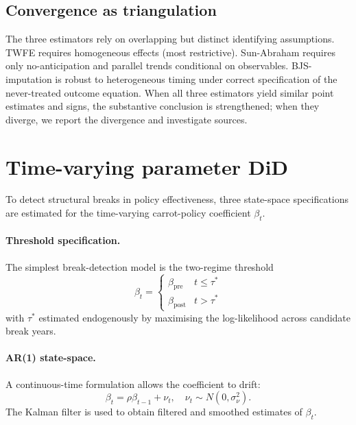 \subsection{Convergence as triangulation}

The three estimators rely on overlapping but distinct identifying assumptions. TWFE requires homogeneous effects (most restrictive). Sun-Abraham requires only no-anticipation and parallel trends conditional on observables. BJS-imputation is robust to heterogeneous timing under correct specification of the never-treated outcome equation. When all three estimators yield similar point estimates and signs, the substantive conclusion is strengthened; when they diverge, we report the divergence and investigate sources.

\section{Time-varying parameter DiD}
\label{sec:methods_tvp}

To detect structural breaks in policy effectiveness, three state-space specifications are estimated for the time-varying carrot-policy coefficient $\beta_t$.

\paragraph{Threshold specification.} The simplest break-detection model is the two-regime threshold
\begin{equation}
\beta_t = \begin{cases} \beta_{\text{pre}} & t \leq \tau^* \\ \beta_{\text{post}} & t > \tau^* \end{cases}
\label{eq:methods_threshold}
\end{equation}
with $\tau^*$ estimated endogenously by maximising the log-likelihood across candidate break years.

\paragraph{AR(1) state-space.} A continuous-time formulation allows the coefficient to drift:
\begin{equation}
\beta_t = \rho \beta_{t-1} + \nu_t, \quad \nu_t \sim N(0, \sigma_\nu^2).
\label{eq:methods_ar1}
\end{equation}
The Kalman filter is used to obtain filtered and smoothed estimates of $\beta_t$.

